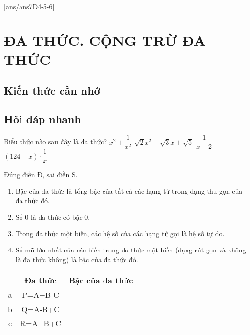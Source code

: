 [ans/ans7D4-5-6]
\newpage
\section{ĐA THỨC. CỘNG TRỪ ĐA THỨC}
\subsection{Kiến thức cần nhớ}

\subsection{Hỏi đáp nhanh}

\begin{ex}%
	Biểu thức nào sau đây là đa thức?
	\choice
	{$x^2+\dfrac{1}{x^2}$}
	{\True $\sqrt{2}x^2-\sqrt{3}x+\sqrt{5}$}
	{$\dfrac{1}{x-2}$}
	{$(124-x)\cdot \dfrac{1}{x}$}
\end{ex}

\begin{ex}%
	Đúng điền Đ, sai điền S.
	\begin{enumerate}
		\item {} Bậc của đa thức là tổng bậc của tất cả các hạng tử trong dạng thu gọn của đa thức đó.
		\item {} Số $0$ là đa thức có bậc $0$.
		\item {} Trong đa thức một biến, các hệ số của các hạng tử gọi là hệ số tự do.
		\item {} Số mũ lớn nhất của các biến trong đa thức một biến (dạng rút gọn và không là đa thức không) là bậc của đa thức đó.
	\end{enumerate}
\end{ex}

\begin{ex}%
	{
		\begin{tabular}{|c|c|c|}
			\hline 
			 & Đa thức & Bậc của đa thức\\ 
			\hline 
			a & P=A+B-C & \sh{$6a-12ab+abc+8abcd$}\\ 
			\hline 
			b & Q=A-B+C & \sh{$-4a+8ab+6abc$}\\ 
			\hline 
			c & R=A+B+C & \sh{$0$}\\ 
			\hline 
		\end{tabular}
	}
\end{ex}


